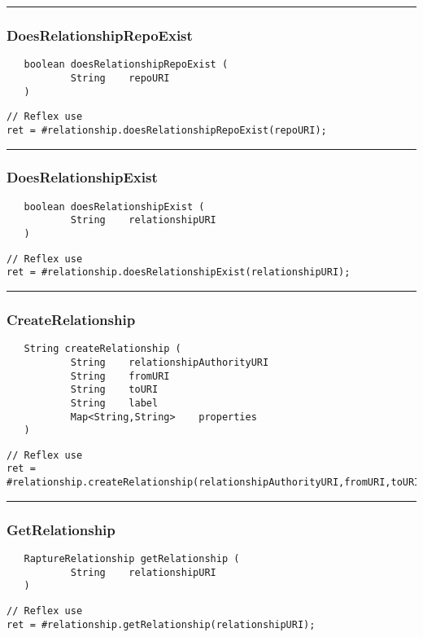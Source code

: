 \rule{15cm}{2pt}
\subsubsection{DoesRelationshipRepoExist}
\label{Api:DoesRelationshipRepoExist}
\begin{verbatim}
   boolean doesRelationshipRepoExist (
           String    repoURI
   )
\end{verbatim}
\begin{lstlisting}[language=reflex]
// Reflex use
ret = #relationship.doesRelationshipRepoExist(repoURI);
\end{lstlisting}



\rule{15cm}{2pt}
\subsubsection{DoesRelationshipExist}
\label{Api:DoesRelationshipExist}
\begin{verbatim}
   boolean doesRelationshipExist (
           String    relationshipURI
   )
\end{verbatim}
\begin{lstlisting}[language=reflex]
// Reflex use
ret = #relationship.doesRelationshipExist(relationshipURI);
\end{lstlisting}



\rule{15cm}{2pt}
\subsubsection{CreateRelationship}
\label{Api:CreateRelationship}
\begin{verbatim}
   String createRelationship (
           String    relationshipAuthorityURI
           String    fromURI
           String    toURI
           String    label
           Map<String,String>    properties
   )
\end{verbatim}
\begin{lstlisting}[language=reflex]
// Reflex use
ret = #relationship.createRelationship(relationshipAuthorityURI,fromURI,toURI,label,properties);
\end{lstlisting}



\rule{15cm}{2pt}
\subsubsection{GetRelationship}
\label{Api:GetRelationship}
\begin{verbatim}
   RaptureRelationship getRelationship (
           String    relationshipURI
   )
\end{verbatim}
\begin{lstlisting}[language=reflex]
// Reflex use
ret = #relationship.getRelationship(relationshipURI);
\end{lstlisting}



